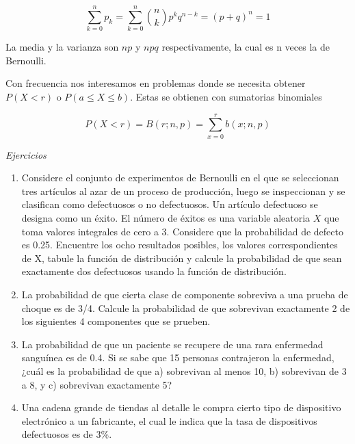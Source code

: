 \documentclass[11pt]{article}
\begin{document}
\[
\displaystyle \sum_{k=0}^{n}{p_{k}}= \sum_{k=0}^{n} \binom{n}{k}p^k q^{n − k}= (p+q)^n=1 
\]

La media y la varianza son \(np\) y \(npq\) respectivamente, la cual es
n veces la de Bernoulli.

Con frecuencia nos interesamos en problemas donde se necesita obtener
\(P(X < r) \text{ o } P(a \leq X \leq b)\). Estas se obtienen con
sumatorias binomiales

\[
P(X < r)= B (r; n, p) =\displaystyle \sum_{x=0}^{r} b(x; n, p)
\]

\emph{Ejercicios}

\begin{enumerate}
\def\labelenumi{\arabic{enumi}.}
\item
  Considere el conjunto de experimentos de Bernoulli en el que se
  seleccionan tres artículos al azar de un proceso de producción, luego
  se inspeccionan y se clasifican como defectuosos o no defectuosos. Un
  artículo defectuoso se designa como un éxito. El número de éxitos es
  una variable aleatoria \(X\) que toma valores integrales de cero a 3.
  Considere que la probabilidad de defecto es 0.25. Encuentre los ocho
  resultados posibles, los valores correspondientes de X, tabule la
  función de distribución y calcule la probabilidad de que sean
  exactamente dos defectuosos usando la función de distribución.
\item
  La probabilidad de que cierta clase de componente sobreviva a una
  prueba de choque es de 3/4. Calcule la probabilidad de que sobrevivan
  exactamente 2 de los siguientes 4 componentes que se prueben.
\item
  La probabilidad de que un paciente se recupere de una rara enfermedad
  sanguínea es de 0.4. Si se sabe que 15 personas contrajeron la
  enfermedad, ¿cuál es la probabilidad de que a) sobrevivan al menos 10,
  b) sobrevivan de 3 a 8, y c) sobrevivan exactamente 5?
\item
  Una cadena grande de tiendas al detalle le compra cierto tipo de
  dispositivo electrónico a un fabricante, el cual le indica que la tasa
  de dispositivos defectuosos es de 3\%.


\end{enumerate}
\end{document}

